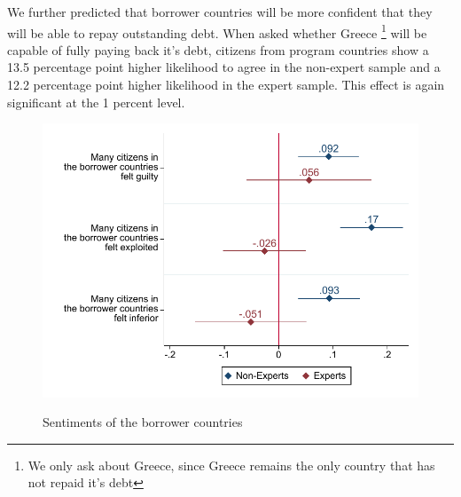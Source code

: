  We further predicted that borrower countries will be more confident that they will be able to repay outstanding debt. 
 When asked whether Greece \footnote{We only ask about Greece, since Greece remains the only country that has not repaid it's debt} will be capable of fully paying back it's debt, citizens from program countries show a 13.5 percentage point higher likelihood to agree in the non-expert sample and a 12.2 percentage point higher likelihood in the expert sample. This effect is again significant at the 1 percent level. \\
 \begin{figure} [h!]
    \begin{center}
    \caption{Sentiments of the borrower countries}
    \includegraphics[scale=0.8]{Question5_1_base.pdf}
    \label{fig:my_label}
    \end{center}
    \tiny
\end{figure}
